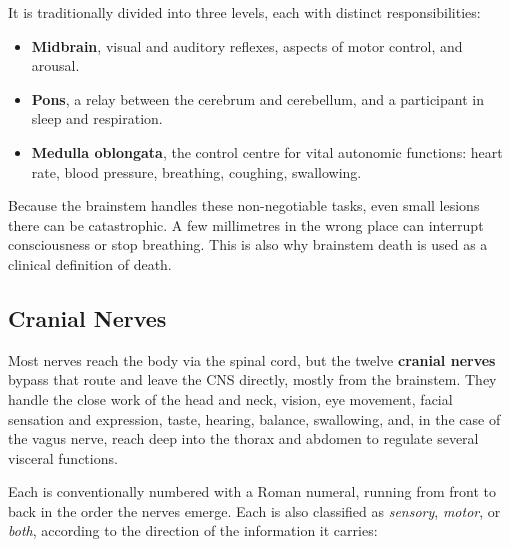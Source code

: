 \documentclass[11pt]{article}
\begin{document}
It is traditionally divided into three levels, each with distinct responsibilities:

\begin{itemize}
    \item \textbf{Midbrain}, visual and auditory reflexes, aspects of motor control, and arousal.
    \item \textbf{Pons}, a relay between the cerebrum and cerebellum, and a participant in sleep and respiration.
    \item \textbf{Medulla oblongata}, the control centre for vital autonomic functions: heart rate, blood pressure, breathing, coughing, swallowing.
\end{itemize}

Because the brainstem handles these non-negotiable tasks, even small lesions there can be catastrophic. A few millimetres in the wrong place can interrupt consciousness or stop breathing. This is also why brainstem death is used as a clinical definition of death.

\subsection{Cranial Nerves}

Most nerves reach the body via the spinal cord, but the twelve \textbf{cranial nerves} bypass that route and leave the CNS directly, mostly from the brainstem. They handle the close work of the head and neck, vision, eye movement, facial sensation and expression, taste, hearing, balance, swallowing, and, in the case of the vagus nerve, reach deep into the thorax and abdomen to regulate several visceral functions.

Each is conventionally numbered with a Roman numeral, running from front to back in the order the nerves emerge. Each is also classified as \textit{sensory}, \textit{motor}, or \textit{both}, according to the direction of the information it carries:
\end{document}
